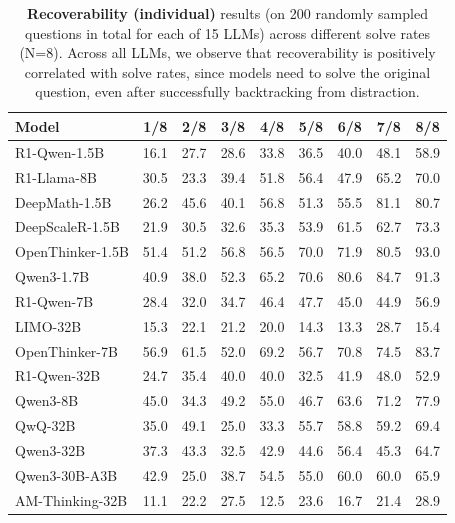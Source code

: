 \documentclass{article} %
\begin{document}
\begin{table}[t]
  \centering
  \small
  \begin{tabular}{l|cccccccc}
    \toprule
    \textbf{Model} &
    \textbf{1/8} & \textbf{2/8} & \textbf{3/8} & \textbf{4/8} &
    \textbf{5/8} & \textbf{6/8} & \textbf{7/8} & \textbf{8/8} \\
    \midrule
    R1-Qwen-1.5B        & 16.1 & 27.7 & 28.6 & 33.8 & 36.5 & 40.0 & 48.1 & 58.9 \\
    R1-Llama-8B         & 30.5 & 23.3 & 39.4 & 51.8 & 56.4 & 47.9 & 65.2 & 70.0 \\
    DeepMath-1.5B       & 26.2 & 45.6 & 40.1 & 56.8 & 51.3 & 55.5 & 81.1 & 80.7 \\
    DeepScaleR-1.5B     & 21.9 & 30.5 & 32.6 & 35.3 & 53.9 & 61.5 & 62.7 & 73.3 \\
    OpenThinker-1.5B    & 51.4 & 51.2 & 56.8 & 56.5 & 70.0 & 71.9 & 80.5 & 93.0 \\
    Qwen3-1.7B          & 40.9 & 38.0 & 52.3 & 65.2 & 70.6 & 80.6 & 84.7 & 91.3 \\
    \midrule
    R1-Qwen-7B          & 28.4 & 32.0 & 34.7 & 46.4 & 47.7 & 45.0 & 44.9 & 56.9 \\
    LIMO-32B            & 15.3 & 22.1 & 21.2 & 20.0 & 14.3 & 13.3 & 28.7 & 15.4 \\
    OpenThinker-7B      & 56.9 & 61.5 & 52.0 & 69.2 & 56.7 & 70.8 & 74.5 & 83.7 \\
    R1-Qwen-32B         & 24.7 & 35.4 & 40.0 & 40.0 & 32.5 & 41.9 & 48.0 & 52.9 \\
    \midrule
    Qwen3-8B            & 45.0 & 34.3 & 49.2 & 55.0 & 46.7 & 63.6 & 71.2 & 77.9 \\
    QwQ-32B             & 35.0 & 49.1 & 25.0 & 33.3 & 55.7 & 58.8 & 59.2 & 69.4 \\
    Qwen3-32B           & 37.3 & 43.3 & 32.5 & 42.9 & 44.6 & 56.4 & 45.3 & 64.7 \\
    Qwen3-30B-A3B           & 42.9 & 25.0 & 38.7 & 54.5 & 55.0 & 60.0 & 60.0 & 65.9 \\
    AM-Thinking-32B     & 11.1 & 22.2 & 27.5 & 12.5 & 23.6 & 16.7 & 21.4 & 28.9 \\
    \bottomrule
  \end{tabular}
  \caption{\textbf{Recoverability (individual)} results (on 200 randomly sampled questions in total for each of 15 LLMs) across different solve rates (N=8). Across all LLMs, we observe that recoverability is positively correlated with solve rates, since models need to solve the original question, even after successfully backtracking from distraction.}
  \label{tab:sr_curve_results}
\end{table}
\end{document}
